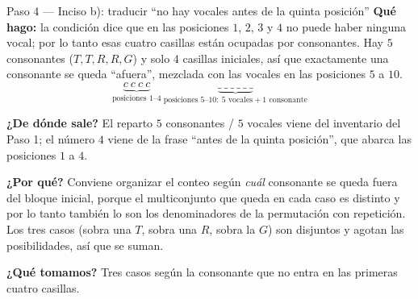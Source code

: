 \documentclass[11pt]{article}
\begin{document}
\begin{paso}{Paso 4 --- Inciso b): traducir ``no hay vocales antes de la quinta posición''}
\textbf{Qué hago:} la condición dice que en las posiciones $1$, $2$, $3$ y $4$ no puede haber ninguna vocal;
por lo tanto esas cuatro casillas están ocupadas por consonantes. Hay $5$ consonantes ($T,T,R,R,G$) y solo
$4$ casillas iniciales, así que exactamente una consonante se queda ``afuera'', mezclada con las vocales en
las posiciones $5$ a $10$.
\[
\underbrace{c\ c\ c\ c}_{\text{posiciones }1\text{--}4}\ \underbrace{\_\ \_\ \_\ \_\ \_\ \_}_{\text{posiciones }5\text{--}10:\ 5\text{ vocales} + 1\text{ consonante}}
\]

\textbf{¿De dónde sale?} El reparto $5$ consonantes / $5$ vocales viene del inventario del Paso 1; el número
$4$ viene de la frase ``antes de la quinta posición'', que abarca las posiciones $1$ a $4$.

\textbf{¿Por qué?} Conviene organizar el conteo según \emph{cuál} consonante se queda fuera del bloque
inicial, porque el multiconjunto que queda en cada caso es distinto y por lo tanto también lo son los
denominadores de la permutación con repetición. Los tres casos (sobra una $T$, sobra una $R$, sobra la $G$)
son disjuntos y agotan las posibilidades, así que se suman.

\textbf{¿Qué tomamos?} Tres casos según la consonante que no entra en las primeras cuatro casillas.
\end{paso}
\end{document}

